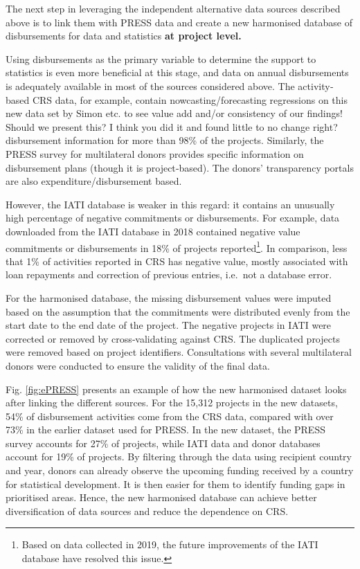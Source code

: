 \documentclass[
]{article}
\begin{document}
The next step in leveraging the independent alternative data sources described above is to link them
with PRESS data and create a new harmonised database of disbursements for data and statistics \textbf{at
project level.}

Using disbursements as the primary variable to determine the support to statistics is even more
beneficial at this stage, and data on annual disbursements is adequately available in most of the
sources considered above. The activity‐based CRS data, for example, contain nowcasting/forecasting
regressions on this new data set by Simon etc. to see value add and/or consistency of our findings!
Should we present this? I think you did it and found little to no change right? disbursement information
for more than 98\% of the projects. Similarly, the PRESS survey for multilateral donors provides specific
information on disbursement plans (though it is project‐based). The donors' transparency portals are
also expenditure/disbursement based.

However, the IATI database is weaker in this regard: it contains an unusually high percentage of
negative commitments or disbursements. For example, data downloaded from the IATI database in
2018 contained negative value commitments or disbursements in 18\% of projects reported\footnote{Based on data collected in 2019, the future improvements of the IATI database have resolved this issue.}. In
comparison, less that 1\% of activities reported in CRS has negative value, mostly associated with loan
repayments and correction of previous entries, i.e.~not a database error.

For the harmonised database, the missing disbursement values were imputed based on the
assumption that the commitments were distributed evenly from the start date to the end date of the
project. The negative projects in IATI were corrected or removed by cross‐validating against CRS. The
duplicated projects were removed based on project identifiers. Consultations with several multilateral
donors were conducted to ensure the validity of the final data.

Fig. \ref{fig:ePRESS} presents an example of how the new harmonised dataset looks after linking the different
sources. For the 15,312 projects in the new datasets, 54\% of disbursement activities come from the
CRS data, compared with over 73\% in the earlier dataset used for PRESS. In the new dataset, the PRESS
survey accounts for 27\% of projects, while IATI data and donor databases account for 19\% of projects.
By filtering through the data using recipient country and year, donors can already observe the
upcoming funding received by a country for statistical development. It is then easier for them to
identify funding gaps in prioritised areas. Hence, the new harmonised database can achieve better
diversification of data sources and reduce the dependence on CRS.
\end{document}
